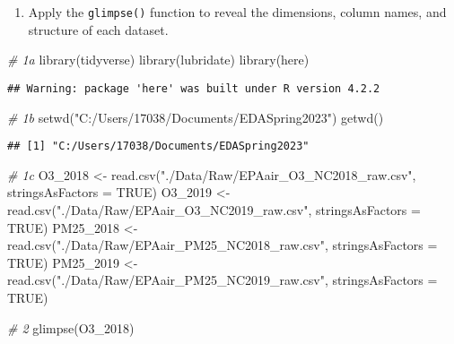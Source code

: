 \documentclass[
]{article}
\newenvironment{Shaded}{\begin{snugshade}}{\end{snugshade}}
\newcommand{\AttributeTok}[1]{\textcolor[rgb]{0.77,0.63,0.00}{#1}}
\newcommand{\CommentTok}[1]{\textcolor[rgb]{0.56,0.35,0.01}{\textit{#1}}}
\newcommand{\ConstantTok}[1]{\textcolor[rgb]{0.00,0.00,0.00}{#1}}
\newcommand{\FunctionTok}[1]{\textcolor[rgb]{0.00,0.00,0.00}{#1}}
\newcommand{\NormalTok}[1]{#1}
\newcommand{\OtherTok}[1]{\textcolor[rgb]{0.56,0.35,0.01}{#1}}
\newcommand{\StringTok}[1]{\textcolor[rgb]{0.31,0.60,0.02}{#1}}
\providecommand{\tightlist}{%
  \setlength{\itemsep}{0pt}\setlength{\parskip}{0pt}}
\begin{document}
\begin{enumerate}
\def\labelenumi{\arabic{enumi}.}
\setcounter{enumi}{1}
\tightlist
\item
  Apply the \texttt{glimpse()} function to reveal the dimensions, column
  names, and structure of each dataset.
\end{enumerate}

\begin{Shaded}
\begin{Highlighting}[]
\CommentTok{\# 1a}
\FunctionTok{library}\NormalTok{(tidyverse)}
\FunctionTok{library}\NormalTok{(lubridate)}
\FunctionTok{library}\NormalTok{(here)}
\end{Highlighting}
\end{Shaded}

\begin{verbatim}
## Warning: package 'here' was built under R version 4.2.2
\end{verbatim}

\begin{Shaded}
\begin{Highlighting}[]
\CommentTok{\# 1b}
\FunctionTok{setwd}\NormalTok{(}\StringTok{"C:/Users/17038/Documents/EDASpring2023"}\NormalTok{)}
\FunctionTok{getwd}\NormalTok{()}
\end{Highlighting}
\end{Shaded}

\begin{verbatim}
## [1] "C:/Users/17038/Documents/EDASpring2023"
\end{verbatim}

\begin{Shaded}
\begin{Highlighting}[]
\CommentTok{\# 1c}
\NormalTok{O3\_2018 }\OtherTok{\textless{}{-}} \FunctionTok{read.csv}\NormalTok{(}\StringTok{"./Data/Raw/EPAair\_O3\_NC2018\_raw.csv"}\NormalTok{, }\AttributeTok{stringsAsFactors =} \ConstantTok{TRUE}\NormalTok{)}
\NormalTok{O3\_2019 }\OtherTok{\textless{}{-}} \FunctionTok{read.csv}\NormalTok{(}\StringTok{"./Data/Raw/EPAair\_O3\_NC2019\_raw.csv"}\NormalTok{, }\AttributeTok{stringsAsFactors =} \ConstantTok{TRUE}\NormalTok{)}
\NormalTok{PM25\_2018 }\OtherTok{\textless{}{-}} \FunctionTok{read.csv}\NormalTok{(}\StringTok{"./Data/Raw/EPAair\_PM25\_NC2018\_raw.csv"}\NormalTok{, }\AttributeTok{stringsAsFactors =} \ConstantTok{TRUE}\NormalTok{)}
\NormalTok{PM25\_2019 }\OtherTok{\textless{}{-}} \FunctionTok{read.csv}\NormalTok{(}\StringTok{"./Data/Raw/EPAair\_PM25\_NC2019\_raw.csv"}\NormalTok{, }\AttributeTok{stringsAsFactors =} \ConstantTok{TRUE}\NormalTok{)}

\CommentTok{\# 2}
\FunctionTok{glimpse}\NormalTok{(O3\_2018)}
\end{Highlighting}
\end{Shaded}
\end{document}
